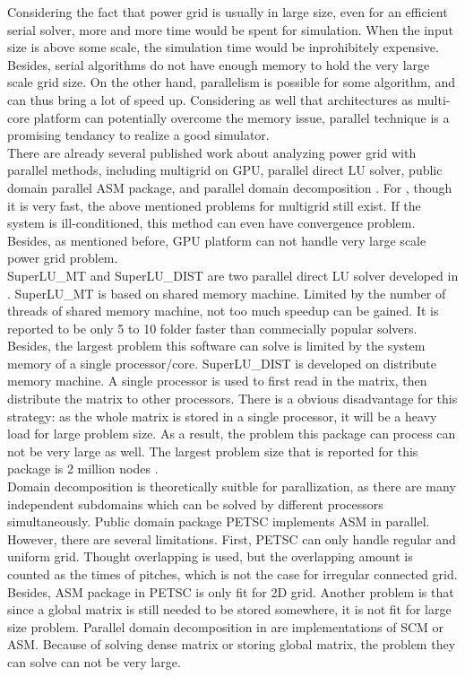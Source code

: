 \documentclass{sig-alternate}
\begin{document}
	Considering the fact that power grid is usually in large size, even for an efficient serial solver, more and more time would be
	spent for simulation. When the input size is above some scale, the simulation time would be inprohibitely expensive.
	Besides, serial algorithms do not have enough memory to hold the very large scale grid size. On the other hand, parallelism is 
	possible for some algorithm, and can thus bring a lot of speed up. Considering as well that architectures as multi-core platform 
	can potentially overcome the memory issue, parallel technique is a promising tendancy to realize a good simulator.\\ 

	There are already several published work about analyzing power grid with parallel methods, including multigrid on GPU\cite{Zhuofeng}, parallel direct LU 
	solver\cite{Super_LU_website}, public domain parallel ASM package\cite{PETSC_website}, and parallel domain decomposition
	\cite{kaisun}\cite{voronov}. For \cite{Zhuofeng}, though it is very fast, the above mentioned problems for multigrid still exist. 
	If the system is ill-conditioned, this method can even have convergence problem. Besides, as mentioned before, GPU platform 
	can not handle very large scale power grid problem.\\
 
	SuperLU\_MT and SuperLU\_DIST are two parallel direct LU solver developed in \cite{Super_LU_website}. SuperLU\_MT is 
	based on shared memory machine. Limited by the number of threads of shared memory machine, not too much speedup can be gained. 
	It is reported to be only 5 to 10 folder faster than commecially popular solvers\cite{Super_LU_website}. Besides, the largest 
	problem this software can solve is limited by the system memory of a single processor/core. SuperLU\_DIST is developed on 
	distribute 
	memory machine. A single processor is used to first read in the matrix, then distribute the matrix to other processors. 
	There is a obvious disadvantage for this strategy: as the whole matrix is stored 
	in a single processor, it will be a heavy load for large problem size. As a result, the problem this package can 
	process can not be very large as well. The largest problem size that is reported for this package is 2 million nodes
	\cite{Super_LU_website}.\\

	Domain decomposition is theoretically suitble for parallization, as there are many independent subdomains which can be
	solved by different processors simultaneously. Public domain package PETSC\cite{PETSC_website} implements ASM in parallel.
	However, there are several limitations. First, PETSC can only handle regular and uniform grid. Thought overlapping is 
	used, but the overlapping amount is counted as the times of pitches, which is not the case for irregular connected grid. 
	Besides, ASM package in PETSC is only fit for 2D grid. Another problem is that since a global matrix is still
	needed to be stored somewhere, it is not fit for large size problem. Parallel domain decomposition in \cite{kaisun}\cite{voronov} 
	are implementations of SCM or ASM. Because of solving dense matrix or storing global matrix, the problem they can solve can not 
	be very large.\\
\end{document}
